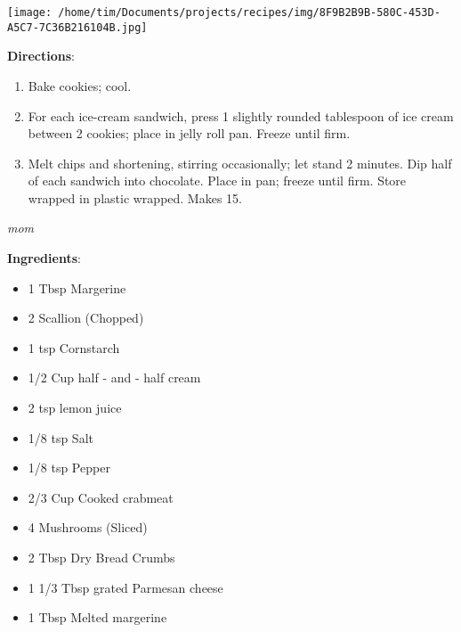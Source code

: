 \documentclass[11pt, twoside, openany]{book}
\begin{document}
\begin{minipage}[t]{0.2\linewidth}
\centering \strut\vspace*{-\baselineskip}\newline
\texttt{[image: /home/tim/Documents/projects/recipes/img/8F9B2B9B-580C-453D-A5C7-7C36B216104B.jpg]}\\
\end{minipage}\vspace{3mm}
\textbf{Directions}:
\vspace{-3mm}\begin{enumerate}\setlength\itemsep{-1mm}
\item Bake cookies; cool.
\item For each ice-cream sandwich, press 1 slightly rounded tablespoon of ice cream between 2 cookies; place in jelly roll pan. Freeze until firm.
\item Melt chips and shortening, stirring occasionally; let stand 2 minutes. Dip half of each sandwich into chocolate. Place in pan; freeze until firm. Store wrapped in plastic wrapped. Makes 15.
\end{enumerate}
 \label{crab-casserole}\hfill\textit{mom}\\
\begin{minipage}[t]{0.8\linewidth}
\textbf{Ingredients}:\vspace{-3mm}
\begin{multicols}{2}
\begin{itemize}\setlength\itemsep{-1mm}
\item 1 Tbsp Margerine
\item 2 Scallion (Chopped)
\item 1 tsp Cornstarch
\item 1/2 Cup half - and - half cream
\item 2 tsp lemon juice
\item 1/8 tsp Salt
\item 1/8 tsp Pepper
\item 2/3 Cup Cooked crabmeat
\item 4 Mushrooms (Sliced)
\item 2 Tbsp Dry Bread Crumbs
\item 1 1/3 Tbsp grated Parmesan cheese
\item 1 Tbsp Melted margerine
\end{itemize}
\end{multicols}
\end{minipage}
\end{document}

